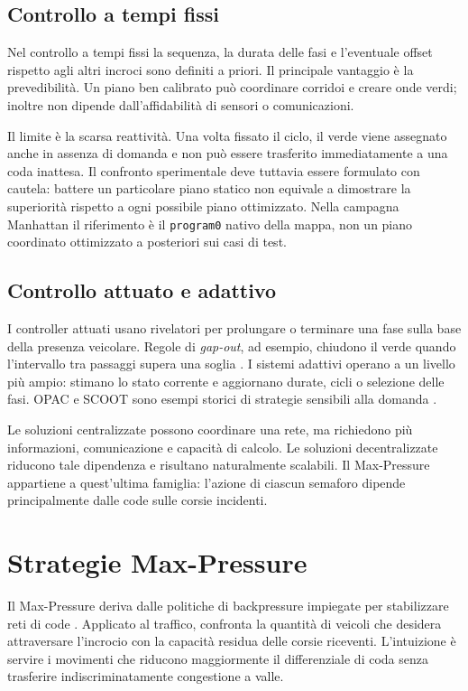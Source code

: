 \documentclass[12pt,a4paper,oneside]{report}
\numberwithin{equation}{chapter}
\begin{document}
\subsection{Controllo a tempi fissi}

Nel controllo a tempi fissi la sequenza, la durata delle fasi e l'eventuale
offset rispetto agli altri incroci sono definiti a priori. Il principale
vantaggio è la prevedibilità. Un piano ben calibrato può coordinare corridoi e
creare onde verdi; inoltre non dipende dall'affidabilità di sensori o
comunicazioni.

Il limite è la scarsa reattività. Una volta fissato il ciclo, il verde viene
assegnato anche in assenza di domanda e non può essere trasferito
immediatamente a una coda inattesa. Il confronto sperimentale deve tuttavia
essere formulato con cautela: battere un particolare piano statico non equivale
a dimostrare la superiorità rispetto a ogni possibile piano ottimizzato. Nella
campagna Manhattan il riferimento è il \texttt{program0} nativo della mappa, non
un piano coordinato ottimizzato a posteriori sui casi di test.

\subsection{Controllo attuato e adattivo}

I controller attuati usano rivelatori per prolungare o terminare una fase sulla
base della presenza veicolare. Regole di \emph{gap-out}, ad esempio, chiudono il
verde quando l'intervallo tra passaggi supera una soglia
\cite{cesme2012gapout}. I sistemi adattivi operano a un livello più ampio:
stimano lo stato corrente e aggiornano durate, cicli o selezione delle fasi.
OPAC e SCOOT sono esempi storici di strategie sensibili alla domanda
\cite{gartner1983opac,robertson1991scoot}.

Le soluzioni centralizzate possono coordinare una rete, ma richiedono più
informazioni, comunicazione e capacità di calcolo. Le soluzioni decentralizzate
riducono tale dipendenza e risultano naturalmente scalabili. Il Max-Pressure
appartiene a quest'ultima famiglia: l'azione di ciascun semaforo dipende
principalmente dalle code sulle corsie incidenti.

\section{Strategie Max-Pressure}

Il Max-Pressure deriva dalle politiche di backpressure impiegate per
stabilizzare reti di code \cite{tassiulas1992stability}. Applicato al traffico,
confronta la quantità di veicoli che desidera attraversare l'incrocio con la
capacità residua delle
corsie riceventi. L'intuizione è servire i movimenti che riducono maggiormente
il differenziale di coda senza trasferire indiscriminatamente congestione a
valle.
\end{document}
